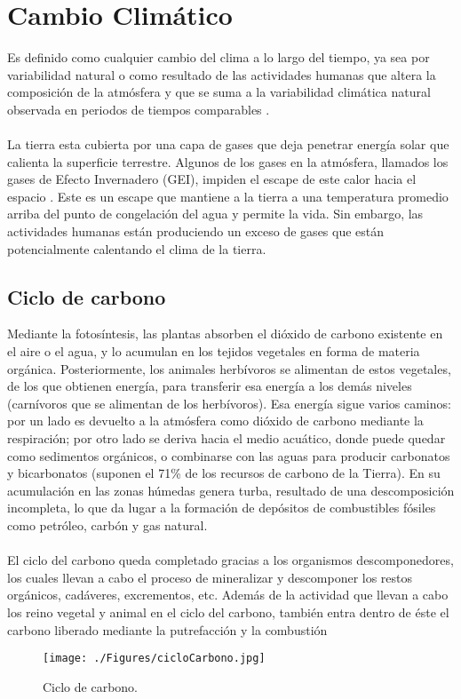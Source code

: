 \newpage{\ } 
\thispagestyle{empty} 

\chapter{Cambio Clim\'atico}

Es definido como cualquier cambio del clima a lo largo del tiempo, ya sea por variabilidad natural o como resultado de las actividades humanas que altera la composici\'on de la atm\'osfera y que se suma a la variabilidad clim\'atica natural observada en periodos de tiempos comparables \cite{robert2002captura}.\\~\\
La tierra esta cubierta por una capa de gases que deja penetrar energ\'ia solar que calienta la superficie terrestre. Algunos de los gases en la atm\'osfera, llamados los gases de Efecto Invernadero (GEI), impiden el escape de este calor hacia el espacio . Este es un escape que mantiene a la tierra a una temperatura promedio arriba del punto de congelaci\'on del agua y permite la vida. Sin embargo, las actividades humanas est\'an produciendo un exceso de gases que est\'an potencialmente calentando el clima de la tierra\cite{almando2014estimacion}.
\section{Ciclo de carbono}
Mediante la fotos\'intesis, las plantas absorben el dióxido de carbono existente en el aire o el agua, y lo acumulan en los tejidos vegetales en forma de materia org\'anica. Posteriormente, los animales herb\'ivoros se alimentan de estos vegetales, de los que obtienen energía, para transferir esa energ\'ia a los dem\'as niveles (carnívoros que se alimentan de los herb\'ivoros).
Esa energía sigue varios caminos: por un lado es devuelto a la atm\'osfera como di\'oxido de carbono mediante la respiraci\'on; por otro lado se deriva hacia el medio acu\'atico, donde puede quedar como sedimentos org\'anicos, o combinarse con las aguas para producir carbonatos y bicarbonatos (suponen el 71\% de los recursos de carbono de la Tierra). En su acumulaci\'on en las zonas h\'umedas genera turba, resultado de una descomposición incompleta, lo que da lugar a la formaci\'on de dep\'ositos de combustibles f\'osiles como petr\'oleo, carb\'on y gas natural.\\~\\
El ciclo del carbono queda completado gracias a los organismos des\-componedores, los cuales llevan a cabo el proceso de mineralizar y descomponer los restos org\'anicos, cad\'averes, excrementos, etc. Adem\'as de la actividad que llevan a cabo los reino vegetal y animal en el ciclo del carbono, también entra dentro de \'este el carbono liberado mediante la putrefacci\'on y la combusti\'on\cite{natur2015PW}
    \begin{figure}[!hbtp]
    	\centering
    	\texttt{[image: ./Figures/cicloCarbono.jpg]}
    	\caption{Ciclo de carbono.}
    	\label{fig:ciclocarbono}
    \end{figure}


